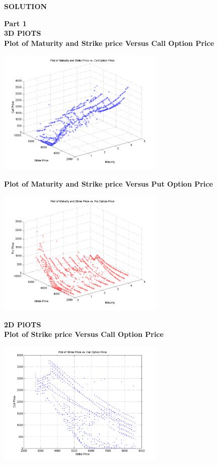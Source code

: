 \documentclass{article}
\begin{document}
\begin{center}
\textbf{SOLUTION}
\end{center}

\textbf{Part 1}\\
\textbf{3D PlOTS}\\

\textbf{Plot of Maturity and Strike price Versus Call Option Price}
\begin{center}
\includegraphics[width =80mm]{Lab9_Q1-Figure1}
\end{center}

\textbf{Plot of Maturity and Strike price Versus Put Option Price}
\begin{center}
\includegraphics[width =80mm]{Lab9_Q1-Figure2}
\end{center}

\textbf{2D PlOTS}\\

\textbf{Plot of Strike price Versus Call Option Price}
\begin{center}
\includegraphics[width =80mm]{Lab9_Q1-Figure3}
\end{center}
\end{document}
